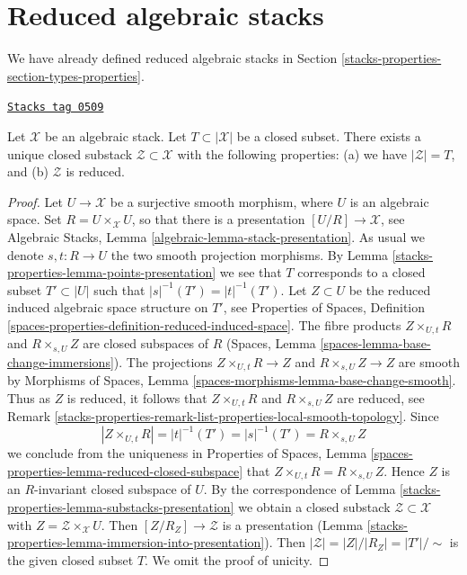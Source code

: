 \section{Reduced algebraic stacks}
\label{stacks-properties-section-reduced}
We have already defined reduced algebraic stacks in
Section \ref{stacks-properties-section-types-properties}.

\begin{lemma}
\label{stacks-properties-lemma-reduced-closed-substack}
\href{https://stacks.math.columbia.edu/tag/0509}{\texttt{Stacks tag 0509}}

Let $\mathcal{X}$ be an algebraic stack.
Let $T \subset |\mathcal{X}|$ be a closed subset.
There exists a unique closed substack $\mathcal{Z} \subset \mathcal{X}$
with the following properties:
(a) we have $|\mathcal{Z}| = T$, and (b) $\mathcal{Z}$ is reduced.
\end{lemma}

\begin{proof}
Let $U \to \mathcal{X}$ be a surjective smooth morphism, where $U$ is an
algebraic space. Set $R = U \times_\mathcal{X} U$, so that there is a
presentation $[U/R] \to \mathcal{X}$, see
Algebraic Stacks, Lemma \ref{algebraic-lemma-stack-presentation}.
As usual we denote $s, t : R \to U$ the two smooth projection morphisms.
By Lemma \ref{stacks-properties-lemma-points-presentation}
we see that $T$ corresponds to a closed subset $T' \subset |U|$ such
that $|s|^{-1}(T') = |t|^{-1}(T')$.
Let $Z \subset U$ be the reduced induced algebraic space
structure on $T'$, see
Properties of Spaces,
Definition \ref{spaces-properties-definition-reduced-induced-space}.
The fibre products
$Z \times_{U, t} R$ and $R \times_{s, U} Z$ are closed subspaces
of $R$
(Spaces, Lemma \ref{spaces-lemma-base-change-immersions}).
The projections $Z \times_{U, t} R \to Z$ and
$R \times_{s, U} Z \to Z$ are smooth by
Morphisms of Spaces, Lemma \ref{spaces-morphisms-lemma-base-change-smooth}.
Thus as $Z$ is reduced, it follows that
$Z \times_{U, t} R$ and $R \times_{s, U} Z$ are reduced, see
Remark \ref{stacks-properties-remark-list-properties-local-smooth-topology}.
Since
$$
|Z \times_{U, t} R| = |t|^{-1}(T') = |s|^{-1}(T') = R \times_{s, U} Z
$$
we conclude from the uniqueness in
Properties of Spaces,
Lemma \ref{spaces-properties-lemma-reduced-closed-subspace}
that $Z \times_{U, t} R = R \times_{s, U} Z$.
Hence $Z$ is an $R$-invariant closed subspace of $U$.
By the correspondence of
Lemma \ref{stacks-properties-lemma-substacks-presentation}
we obtain a closed substack $\mathcal{Z} \subset \mathcal{X}$
with $Z = \mathcal{Z} \times_\mathcal{X} U$. Then
$[Z/R_Z] \to \mathcal{Z}$ is a presentation
(Lemma \ref{stacks-properties-lemma-immersion-into-presentation}).
Then $|\mathcal{Z}| = |Z|/|R_Z| = |T'|/\sim$ is the given
closed subset $T$. We omit the proof of unicity.
\end{proof}

